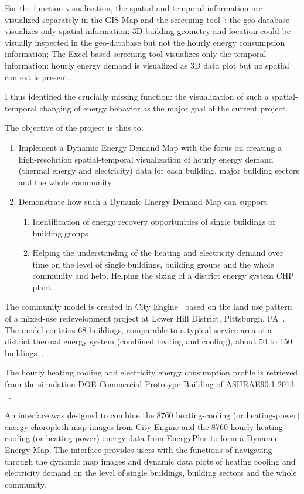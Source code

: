 For the function visualization, the spatial and temporal information
are visualized separately in the GIS Map and the screening
tool~\cite{baird2014}: the geo-database visualizes only spatial
information: 3D building geometry and location could be visually
inspected in the geo-database but not the hourly energy consumption
information; The Excel-based screening tool visualizes only the
temporal information: hourly energy demand is visualized as 3D data
plot but no spatial context is present.

I thus identified the crucially missing function: the
visualization of such a spatial-temporal changing of energy behavior
as the major goal of the current project.

The objective of the project is thus to:
\begin{enumerate}
\item Implement a Dynamic Energy Demand Map with the focus on creating
  a high-resolution spatial-temporal visualization of hourly energy
  demand (thermal energy and electricity) data for each building,
  major building sectors and the whole community
\item Demonstrate how such a Dynamic Energy Demand Map can support
  \begin{enumerate}
  \item Identification of energy recovery opportunities of single
    buildings or building groups
  \item Helping the understanding of the heating and electricity
    demand over time on the level of single buildings, building groups
    and the whole community and help. Helping the sizing of a district
    energy system CHP plant.
  \end{enumerate}
\end{enumerate}

The community model is created in City Engine~\cite{cityEngine2015}
based on the land use pattern of a mixed-use redevelopment project at
Lower Hill District, Pittsburgh, PA~\cite{Ramesh2013}. The model
contains 68 buildings, comparable to a typical service area of a
district thermal energy system (combined heating and cooling), about
50 to 150 buildings~\cite{IDEA2005}.

The hourly heating cooling and electricity energy consumption profile
is retrieved from the simulation DOE Commercial Prototype Building of
ASHRAE90.1-2013 ~\cite{DOEprototype}.

An interface was designed to combine the 8760 heating-cooling (or
heating-power) energy choropleth map images from City Engine and the
8760 hourly heating-cooling (or heating-power) energy data from
EnergyPlus to form a Dynamic Energy Map. The interface provides users
with the functions of navigating through the dynamic map images and
dynamic data plots of heating cooling and electricity demand on the
level of single buildings, building sectors and the whole community.

